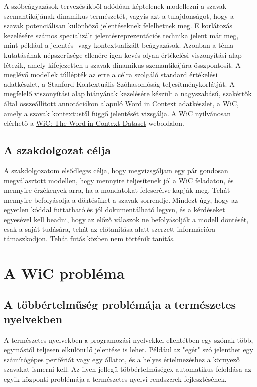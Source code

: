 \documentclass[12pt]{report}
\theoremstyle{definition}
\begin{document}
A szóbeágyazások tervezésükből adódóan képtelenek modellezni a szavak szemantikájának dinamikus természetét, vagyis azt a tulajdonságot, hogy a szavak potenciálisan különböző jelentéseknek felelhetnek meg. E korlátozás kezelésére számos specializált jelentésreprezentációs technika jelent már meg, mint például a jelentés- vagy kontextualizált beágyazások. Azonban a téma kutatásának népszerűsége ellenére igen kevés olyan értékelési viszonyítási alap létezik, amely kifejezetten a szavak dinamikus szemantikájára összpontosít. A meglévő modellek túllépték az erre a célra szolgáló standard értékelési adatkészlet, a Stanford Kontextuális Szóhasonlóság teljesítménykorlátját. A megfelelő viszonyítási alap hiányának kezelésére készült a nagyszabású, szakértők által összeállított annotációkon alapuló Word in Context adatkészlet, a WiC, amely a szavak kontextustől függő jelentését vizsgálja. A WiC nyilvánosan elérhető a \href{https://pilehvar.github.io/wic/}{WiC: The Word-in-Context Dataset} weboldalon.\cite{pilehvar2019wic}


\section*{A szakdolgozat célja}

A szakdolgozatom elsődleges célja, hogy megvizsgáljam egy pár gondosan megválasztott modellen, hogy mennyire teljesítenek jól a WiC feladaton, és mennyire érzékenyek arra, ha a mondatokat felcserélve kapják meg. Tehát mennyire befolyásolja a döntésüket a szavak sorrendje. Mindezt úgy, hogy az egyetlen kóddal futtatható és jól dokumentálható legyen, és a kérdéseket egyesével kell beadni, hogy az előző válaszok ne befolyásolják a modell döntését, csak a saját tudására, tehát az előtanítása alatt szerzett információra támaszkodjon. Tehát futás közben nem történik tanítás.


\chapter{A WiC probléma}
{}

\section{A többértelműség problémája a természetes nyelvekben}

A természetes nyelvekben a programozási nyelvekkel ellentétben egy szónak több, egymástól teljesen elkülönülő jelentése is lehet. Például az "egér" szó jelenthet egy számítógépes perifériát vagy egy állatot, és a helyes értelmezéshez a környező szavakat ismerni kell. Az ilyen jellegű többértelműségek automatikus feloldása az egyik központi problémája a természetes nyelvi rendszerek fejlesztésének.
\end{document}

